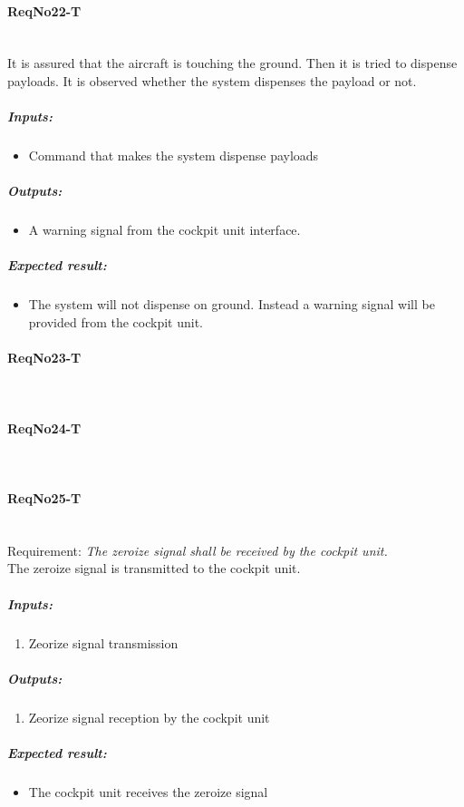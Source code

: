 \paragraph{ReqNo22-T}\mbox{}\\ %
It is assured that the aircraft is touching the ground. Then it is tried to dispense payloads. It is observed whether the system dispenses the payload or not.
\\
	\subparagraph{Inputs:}
	\begin{itemize}
	\item Command that makes the system dispense payloads 
	\end{itemize}
	\subparagraph{Outputs:}
	\begin{itemize}
	\item A warning signal from the cockpit unit interface.
	\end{itemize}
	\subparagraph{Expected result:}
	\begin{itemize}
	\item The system will not dispense on ground. Instead a warning signal will be provided from the cockpit unit.
	\end{itemize}

\paragraph{ReqNo23-T}\mbox{}\\ %


\paragraph{ReqNo24-T}\mbox{}\\ %

\paragraph{ReqNo25-T}\mbox{}\\ %
Requirement: \textit{The zeroize signal shall be received by the cockpit unit.}\\

The zeroize signal is transmitted to the cockpit unit. 
\subparagraph{Inputs:}
	\begin{enumerate}
	\item Zeorize signal transmission
	\end{enumerate}
\subparagraph{Outputs:}
	\begin{enumerate}
	\item Zeorize signal reception by the cockpit unit
	\end{enumerate}
\subparagraph{Expected result:}
	\begin{itemize}
	\item The cockpit unit receives the zeroize signal 
	\end{itemize}

